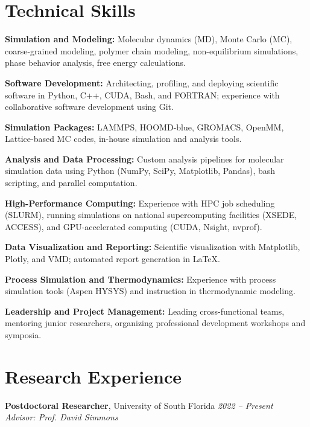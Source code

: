 \documentclass[letterpaper,12pt]{article}
\begin{document}
\section*{Technical Skills}
\begin{tabitemize}
    \item \textbf{Simulation and Modeling:} Molecular dynamics (MD), Monte Carlo (MC), coarse-grained modeling, polymer chain modeling, non-equilibrium simulations, phase behavior analysis, free energy calculations.
    \item \textbf{Software Development:} Architecting, profiling, and deploying scientific software in Python, C++, CUDA, Bash, and FORTRAN; experience with collaborative software development using Git.
    \item \textbf{Simulation Packages:} LAMMPS, HOOMD-blue, GROMACS, OpenMM, Lattice-based MC codes, in-house simulation and analysis tools.
    \item \textbf{Analysis and Data Processing:} Custom analysis pipelines for molecular simulation data using Python (NumPy, SciPy, Matplotlib, Pandas), bash scripting, and parallel computation.
    \item \textbf{High-Performance Computing:} Experience with HPC job scheduling (SLURM), running simulations on national supercomputing facilities (XSEDE, ACCESS), and GPU-accelerated computing (CUDA, Nsight, nvprof).
    \item \textbf{Data Visualization and Reporting:} Scientific visualization with Matplotlib, Plotly, and VMD; automated report generation in LaTeX.
    \item \textbf{Process Simulation and Thermodynamics:} Experience with process simulation tools (Aspen HYSYS) and instruction in thermodynamic modeling.
    \item \textbf{Leadership and Project Management:} Leading cross-functional teams, mentoring junior researchers, organizing professional development workshops and symposia.
\end{tabitemize}

\vspace{-0.3\baselineskip}
\section*{Research Experience}

\textbf{Postdoctoral Researcher}, University of South Florida \hfill \textit{2022 – Present} \\
\textit{Advisor: Prof. David Simmons}
\vspace{0.5em}
\end{document}
